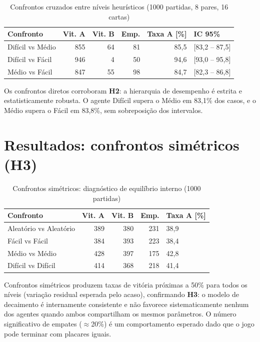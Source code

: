 \documentclass[
    12pt,
    openright,
    twoside,
    a4paper,
    english,
    brazil
]{abntex2}
\begin{document}
\begin{table}[htb]
\centering
\caption{Confrontos cruzados entre níveis heurísticos (1000 partidas, 8 pares, 16 cartas)}
\label{tab:resultados_cruzados}
\begin{tabular}{lrrrrl}
\toprule
\textbf{Confronto} & \textbf{Vit. A} & \textbf{Vit. B} & \textbf{Emp.} & \textbf{Taxa A [\%]} & \textbf{IC 95\%} \\
\midrule
Difícil vs Médio   & 855 &  64 &  81 & 85,5 & [83,2 -- 87,5] \\
Difícil vs Fácil   & 946 &   4 &  50 & 94,6 & [93,0 -- 95,8] \\
Médio vs Fácil     & 847 &  55 &  98 & 84,7 & [82,3 -- 86,8] \\
\bottomrule
\end{tabular}
\end{table}

Os confrontos diretos corroboram \textbf{H2}: a hierarquia de desempenho é estrita e estatisticamente robusta. O agente Difícil supera o Médio em 83,1\% dos casos, e o Médio supera o Fácil em 83,8\%, sem sobreposição dos intervalos.

\section{Resultados: confrontos simétricos (H3)}

\begin{table}[htb]
\centering
\caption{Confrontos simétricos: diagnóstico de equilíbrio interno (1000 partidas)}
\label{tab:resultados_simetricos}
\begin{tabular}{lrrrl}
\toprule
\textbf{Confronto} & \textbf{Vit. A} & \textbf{Vit. B} & \textbf{Emp.} & \textbf{Taxa A [\%]} \\
\midrule
Aleatório vs Aleatório & 389 & 380 & 231 & 38,9 \\
Fácil vs Fácil         & 384 & 393 & 223 & 38,4 \\
Médio vs Médio         & 428 & 397 & 175 & 42,8 \\
Difícil vs Difícil     & 414 & 368 & 218 & 41,4 \\
\bottomrule
\end{tabular}
\end{table}

Confrontos simétricos produzem taxas de vitória próximas a 50\% para todos os níveis (variação residual esperada pelo acaso), confirmando \textbf{H3}: o modelo de decaimento é internamente consistente e não favorece sistematicamente nenhum dos agentes quando ambos compartilham os mesmos parâmetros. O número significativo de empates ($\approx$20\%) é um comportamento esperado dado que o jogo pode terminar com placares iguais.
\end{document}
